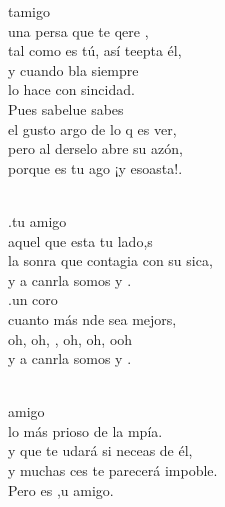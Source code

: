 \documentclass[12pt]{article}
\begin{document}
\begin{multicols*}{2}
\begin{cancion}[Es tu amigo es][Kairoi]%
	 tamigo  \\
	una persa que te qere ,  \\
	tal como es tú, así teepta él, \\
	y cuando bla siempre \\
	lo hace con sincidad.\\
	Pues sabelue sabes  \\
	el gusto argo de lo q es ver,\\
	pero al derselo abre su azón,  \\
	porque es tu ago ¡y esoasta!.\\\jump\\
	\begin{chorus}%
	.tu amigo  \\
	aquel que esta tu lado,s \\
	la sonra que contagia con su sica,\\
	y a canrla somos  y .\\
	.un coro  \\
	cuanto más nde sea mejors, \\
	oh, oh, , oh, oh,  ooh \\
	y a canrla somos  y .  \\
	\end{chorus}%
	\jump\\
	  amigo  \\
	lo más prioso de la mpía. \\
	y que te udará si neceas de él,\\
	y muchas ces te parecerá impoble.\\
	Pero es ,u amigo. \\

\end{cancion}
\end{multicols*}
\end{document}

